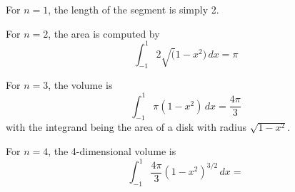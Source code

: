 

For $n=1$, the length of the segment is simply 2.

For $n=2$, the area is computed by 
$$
\int_{-1}^1 2 \sqrt(1-x^2)\,dx = \pi 
$$

For $n=3$, the volume is 
$$
\int_{-1}^1 \pi (1-x^2)\,dx = \frac{4\pi}{3} 
$$
with the integrand being the area of a disk with radius $\sqrt{1-x^2}$.

For $n=4$, the 4-dimensional volume is 
$$
\int_{-1}^1 \frac{4\pi}{3} (1-x^2)^{3/2}\,dx = 
$$


